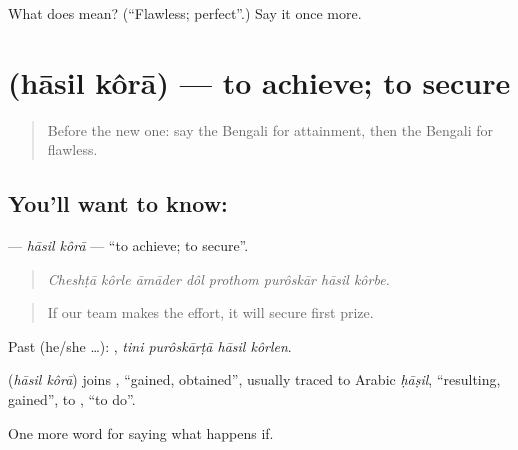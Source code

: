 \begin{tcolorbox}[breakable,colback=teal!4,colframe=teal!35!black,title={Before you move on}]
What does  mean? (\textquotedblleft{}Flawless; perfect\textquotedblright{}.) Say it once more.
\end{tcolorbox}
\section[\texorpdfstring{\bn{হাসিল} \bn{করা} (hāsil kôrā)}{হাসিল করা (hāsil kôrā)}]{  (hāsil kôrā) — to achieve; to secure}

\label{lesson:BN-C543-hasil-kora}



\begin{quote}
Before the new one: say the Bengali for attainment, then the Bengali for flawless.
\end{quote}

\subsection*{You'll want to know:  }
\textbf{ } — \emph{hāsil kôrā} — \textquotedblleft{}to achieve; to secure\textquotedblright{}.

\begin{quote}
       
\end{quote}

\begin{quote}
\emph{Cheshṭā kôrle āmāder dôl prothom purôskār hāsil kôrbe.}
\end{quote}

\begin{quote}
If our team makes the effort, it will secure first prize.
\end{quote}

Past (he/she …):    , \emph{tini purôskārṭā hāsil kôrlen}.

\begin{cousinweb}
\textbf{ } (\emph{hāsil kôrā}) joins , \textquotedblleft{}gained, obtained\textquotedblright{}, usually traced to Arabic \emph{ḥāṣil}, \textquotedblleft{}resulting, gained\textquotedblright{}, to , \textquotedblleft{}to do\textquotedblright{}.
\end{cousinweb}

\begin{grammarlens}[title={What you've built}]
One more word for saying what happens if.
\end{grammarlens}

